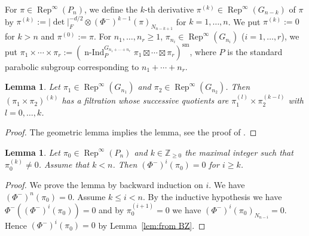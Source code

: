 \documentclass[a4paper]{amsart}
\numberwithin{equation}{section}
\newtheorem{lem}[thm]{Lemma}
\theoremstyle{remark}
\theoremstyle{definition}
\DeclareMathOperator{\nInd}{n-Ind}
\DeclareMathOperator{\Rep}{Rep}
\newcommand{\Z}{\mathbb{Z}}
\newcommand{\sm}{\mathrm{sm}}
\begin{document}
For $\pi\in \Rep^{\infty}(P_{n})$, we define the $k$-th derivative $\pi^{(k)} \in \Rep^{\infty}(G_{n - k})$ of $\pi$ by $\pi^{(k)} := \lvert\det\rvert_{F}^{-d/2}\otimes (\Phi^{-})^{k - 1}(\pi)_{N_{n - k + 1}}$ for $k = 1,\ldots,n$.
We put $\pi^{(k)} := 0$ for $k > n$ and $\pi^{(0)} := \pi$.
For $n_{1},\ldots,n_{r}\ge 1$, $\pi_{n_{i}}\in \Rep^{\infty}(G_{n_{i}})$ ($i = 1,\ldots,r$), we put $\pi_{1}\times\cdots\times\pi_{r} := (\nInd_{P}^{G_{n_{1} + \cdots + n_{r}}}\pi_{1}\boxtimes\cdots\boxtimes\pi_{r})^{\sm}$, where $P$ is the standard parabolic subgroup corresponding to $n_{1} + \cdots + n_{r}$.
\begin{lem}\label{lem:derivative of product}
Let $\pi_{1}\in\Rep^{\infty}(G_{n_{1}})$ and $\pi_{2}\in \Rep^{\infty}(G_{n_{2}})$.
Then $(\pi_{1}\times\pi_{2})^{(k)}$ has a filtration whose successive quotients are $\pi_{1}^{(l)}\times\pi_{2}^{(k - l)}$ with $l = 0,\ldots,k$.
\end{lem}
\begin{proof}
The geometric lemma implies the lemma, see the proof of \cite[4.5 Lemma]{MR0579172}.
\end{proof}

\begin{lem}\label{lem:derivative}
Let $\pi_{0}\in \Rep^{\infty}(P_{n})$ and $k\in\Z_{\ge 0}$ the maximal integer such that $\pi_{0}^{(k)}\ne 0$.
Assume that $k < n$.
Then $(\Phi^{-})^{i}(\pi_{0}) = 0$ for $i\ge k$.
\end{lem}
\begin{proof}
We prove the lemma by backward induction on $i$.
We have $(\Phi^{-})^{n}(\pi_{0}) = 0$. Assume $k \le i < n$.
By the inductive hypothesis we have $\Phi^{-}((\Phi^{-})^{i}(\pi_{0})) = 0$ and by $\pi_{0}^{(i + 1)} = 0$ we have $(\Phi^{-})^{i}(\pi_{0})_{N_{n - i}} = 0$.
Hence $(\Phi^{-})^{i}(\pi_{0}) = 0$ by Lemma~\ref{lem:from BZ}.
\end{proof}
\end{document}
